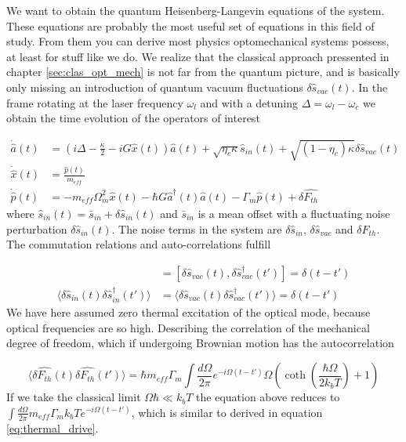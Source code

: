We want to obtain the quantum Heisenberg-Langevin equations \cite{gardiner2004} of the system. These equations are probably the most useful set of equations in this field of study. From them you can derive most physics optomechanical systems possess, at least for stuff like we do. We realize that the classical approach pressented in chapter \ref{sec:clas_opt_mech} is not far from the quantum picture, and is basically only missing an introduction of quantum vacuum fluctuations $\delta\hat{s}_{vac}(t)$. In the frame rotating at the laser frequency $\omega_l$ and with a detuning $\Delta = \omega_l - \omega_c$ we obtain the time evolution of the operators of interest \cite{schliesser2009, weis2010}

\begin{align}
\dot{\hat{a}}(t) & = \left( i\Delta - \frac{\kappa}{2} -iG\hat{x}(t) \right)\hat{a}(t) + \sqrt{\eta_c\kappa}\hat{s}_{in}(t) + \sqrt{(1 - \eta_c)\kappa}\delta\hat{s}_{vac}(t) \label{eq:h_lan1} \\
\dot{\hat{x}}(t) & = \frac{\hat{p}(t)}{m_{eff}} \label{eq:h_lan2} \\
\dot{\hat{p}}(t) & = -m_{eff}\Omega_m^2\hat{x}(t) - \hbar G\hat{a}^\dagger(t)\hat{a}(t) - \Gamma_m\hat{p}(t) + \delta\hat{F_{th}} \label{eq:h_lan3}
\end{align}
\noindent
where $\hat{s}_{in}(t) = \bar{s}_{in} + \delta\hat{s}_{in}(t)$ and $\bar{s}_{in}$ is a mean offset with a fluctuating noise perturbation $\delta\hat{s}_{in}(t)$. The noise terms in the system are $\delta\hat{s}_{in}$, $\delta\hat{s}_{vac}$ and $\delta\hat{F_{th}}$. The commutation relations and auto-correlations fulfill \cite{giovannetti2001}

\begin{align}
[\delta\hat{s}_{in}(t), \delta\hat{s}_{in}^\dagger(t')] & = [\delta\hat{s}_{vac}(t), \delta\hat{s}_{vac}^\dagger(t')] = \delta(t - t') \\
\langle \delta\hat{s}_{in}(t)\delta\hat{s}_{in}^\dagger(t') \rangle & = \langle \delta\hat{s}_{vac}(t)\delta\hat{s}_{vac}^\dagger(t') \rangle = \delta(t - t')
\end{align}
\noindent
We have here assumed zero thermal excitation of the optical mode, because optical frequencies are so high. Describing the correlation of the mechanical degree of freedom, which if undergoing Brownian motion has the autocorrelation \cite{gardiner2004}

\begin{equation}
\langle \delta\hat{F_{th}}(t)\delta\hat{F_{th}}(t') \rangle = \hbar m_{eff}\Gamma_m\int\frac{d\Omega}{2\pi} e^{-i\Omega(t - t')}\Omega\left( \coth\left( \frac{\hbar\Omega}{2k_bT} \right) + 1\right)
\end{equation}
\noindent
If we take the classical limit $\Omega\hbar \ll k_bT$ the equation above reduces to $\int\frac{d\Omega}{2\pi}m_{eff}\Gamma_mk_bTe^{-i\Omega(t - t')}$, which is similar to derived in equation \eqref{eq:thermal_drive}.

